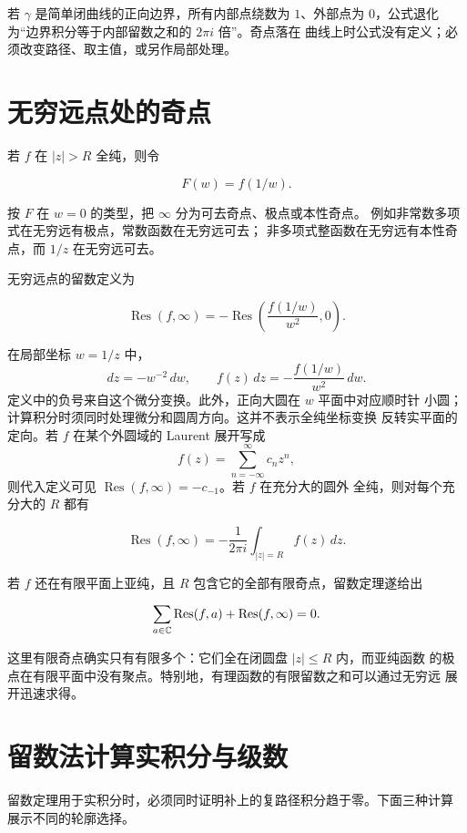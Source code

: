 若 \(\gamma\) 是简单闭曲线的正向边界，所有内部点绕数为 \(1\)、外部点为
\(0\)，公式退化为“边界积分等于内部留数之和的 \(2\pi i\) 倍”。奇点落在
曲线上时公式没有定义；必须改变路径、取主值，或另作局部处理。

\section{无穷远点处的奇点}

若 \(f\) 在 \(|z|>R\) 全纯，则令

\[
 F(w)=f(1/w).
\]

按 \(F\) 在 \(w=0\) 的类型，把 \(\infty\) 分为可去奇点、极点或本性奇点。
例如非常数多项式在无穷远有极点，常数函数在无穷远可去；
非多项式整函数在无穷远有本性奇点，而
\(1/z\) 在无穷远可去。

无穷远点的留数定义为

\begin{equation}
 \operatorname{Res}(f,\infty)
 =-\operatorname{Res}\left(\frac{f(1/w)}{w^2},0\right).
 \label{eq:residue-infinity}
\end{equation}

在局部坐标 \(w=1/z\) 中，
\[
 dz=-w^{-2}\,dw,\qquad
 f(z)\,dz=-\frac{f(1/w)}{w^2}\,dw.
\]
定义中的负号来自这个微分变换。此外，正向大圆在 \(w\) 平面中对应顺时针
小圆；计算积分时须同时处理微分和圆周方向。这并不表示全纯坐标变换
反转实平面的定向。若 \(f\) 在某个外圆域的
Laurent 展开写成
\[
 f(z)=\sum_{n=-\infty}^{\infty}c_nz^n,
\]
则代入定义可见 \(\operatorname{Res}(f,\infty)=-c_{-1}\)。若 \(f\) 在充分大的圆外
全纯，则对每个充分大的 \(R\) 都有

\[
 \operatorname{Res}(f,\infty)
 =-\frac1{2\pi i}\int_{|z|=R}f(z)\,dz.
\]

若 \(f\) 还在有限平面上亚纯，且 \(R\) 包含它的全部有限奇点，留数定理遂给出

\begin{equation}
 \sum_{a\in\mathbb{C}}\operatorname{Res}(f,a)
 +\operatorname{Res}(f,\infty)=0.
 \label{eq:global-residue-sum}
\end{equation}

这里有限奇点确实只有有限多个：它们全在闭圆盘 \(|z|\le R\) 内，而亚纯函数
的极点在有限平面中没有聚点。特别地，有理函数的有限留数之和可以通过无穷远
展开迅速求得。

\section{留数法计算实积分与级数}

留数定理用于实积分时，必须同时证明补上的复路径积分趋于零。下面三种计算
展示不同的轮廓选择。

